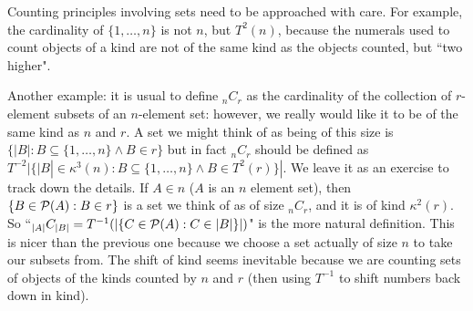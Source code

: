 \documentclass[12pt]{article}
\begin{document}
Counting principles involving sets need to be approached with care.  For example, the cardinality of $\{1,\ldots,n\}$ is not $n$, but $T^2(n)$, because the numerals used to count objects of a kind are not of the same kind as the objects counted, but ``two higher".

Another example:  it is usual to define $_nC_r$ as the cardinality of the collection of $r$-element subsets of an $n$-element set:  however, we really would like it to be of the same kind as $n$ and $r$.  A set we might think
of as being of this size is $\{|B|:B \subseteq \{1,\ldots,n\} \wedge B \in r\}$  but in fact $_nC_r$ should be defined
as $T^{-2}|\{|B|\in \kappa^3(n):B\subseteq \{1,\ldots,n\} \wedge B \in T^2(r)\}|$.  We leave it as an exercise to track down the details.  If $A \in n$ ($A$ is an $n$ element set), then $\{B \in {\cal P}(A):B \in r\}$ is a set we think
of as of size $_nC_r$, and it is of kind $\kappa^2(r)$.    So ``$_{|A|}C_{|B|}=T^{-1}(|\{C \in {\cal P}(A):C \in |B|\}|)$"  is the more natural definition.  This is nicer than the previous one because we choose a set actually of size $n$ to take our subsets from.  The shift of kind seems inevitable because we are counting sets of objects of the kinds counted by $n$ and $r$ (then using $T^{-1}$ to shift numbers back down in kind).
\end{document}
